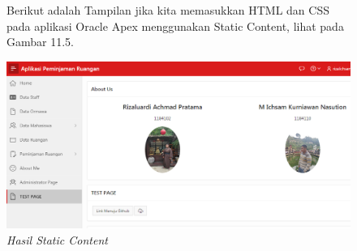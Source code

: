 \begin{enumerate}
    \begin{figure}
    \item Berikut adalah Tampilan jika kita memasukkan HTML dan CSS pada aplikasi Oracle Apex menggunakan Static Content, lihat pada Gambar 11.5.
        
        \centering
        \includegraphics[scale=0.4]{figures/bab11/5.png}
        \caption{\textit{Hasil Static Content}}
        \label{Static Content5}
    \end{figure}
    
    
\end{enumerate}